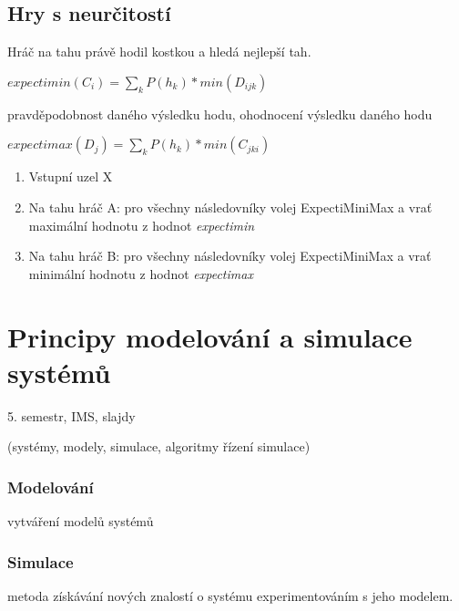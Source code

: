 \documentclass[a4paper, 11pt]{report}
\begin{document}
\section{Hry s neurčitostí}

Hráč na tahu právě hodil kostkou a hledá nejlepší tah.

$expectimin(C_i) = \sum_k P( h_k) * min(D_{ijk})$

pravděpodobnost daného výsledku hodu, ohodnocení výsledku daného hodu

$expectimax(D_j) = \sum_k P( h_k) * min(C_{jki})$

\begin{enumerate}
	\item Vstupní uzel X
	\item Na tahu hráč A: pro všechny následovníky volej ExpectiMiniMax a vrať maximální hodnotu z hodnot \emph{expectimin}
	\item Na tahu hráč B: pro všechny následovníky volej ExpectiMiniMax a vrať minimální hodnotu z hodnot \emph{expectimax}
\end{enumerate}



























\chapter{Principy modelování a simulace systémů} \label{cha:25}

5. semestr, IMS, slajdy

(systémy, modely, simulace, algoritmy řízení simulace)

\subsection{Modelování}
vytváření modelů systémů

\subsection{Simulace} metoda získávání nových znalostí o systému experimentováním s jeho modelem.
\end{document}
